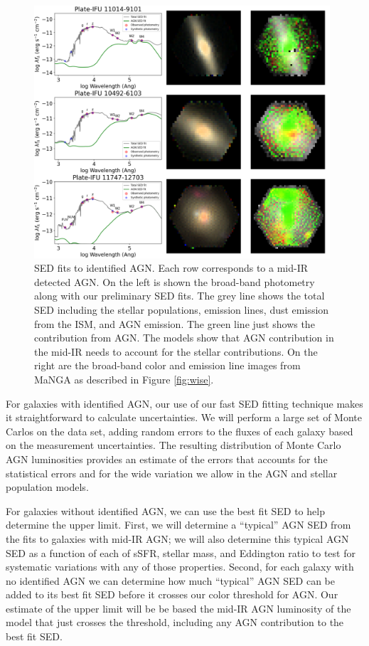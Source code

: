\documentclass[12pt, preprint]{hacked-aastex}
\begin{document}
\begin{figure}[t!]
\includegraphics[width=0.98\textwidth]{spec-grid.png}
    \caption{
\label{fig:fits} \small SED fits to identified AGN. Each row
corresponds to a mid-IR detected AGN. On the left is shown the
broad-band photometry along with our preliminary SED fits.  The grey
line shows the total SED including the stellar populations, emission
lines, dust emission from the ISM, and AGN emission. The green line
just shows the contribution from AGN. The models show that AGN
contribution in the mid-IR needs to account for the stellar
contributions. On the right are the broad-band color and emission line
images from MaNGA as described in Figure \ref{fig:wise}.}
\end{figure}

For galaxies with identified AGN, our use of our fast SED fitting
technique makes it straightforward to calculate uncertainties.  We
will perform a large set of Monte Carlos on the data set, adding
random errors to the fluxes of each galaxy based on the measurement
uncertainties. The resulting distribution of Monte Carlo AGN
luminosities provides an estimate of the errors that accounts for the
statistical errors and for the wide variation we allow in the AGN and
stellar population models.

For galaxies without identified AGN, we can use the best fit SED to
help determine the upper limit. First, we will determine a ``typical''
AGN SED from the fits to galaxies with mid-IR AGN; we will also
determine this typical AGN SED as a function of each of sSFR, stellar
mass, and Eddington ratio to test for systematic variations with any
of those properties. Second, for each galaxy with no identified AGN we
can determine how much ``typical'' AGN SED can be added to its best
fit SED before it crosses our color threshold for AGN. Our estimate of
the upper limit will be be based the mid-IR AGN luminosity of the
model that just crosses the threshold, including any AGN contribution
to the best fit SED.
\end{document}
